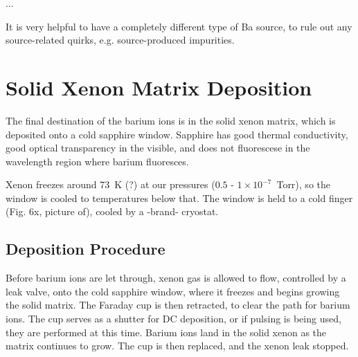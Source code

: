 ...

It is very helpful to have a completely different type of Ba source, to rule out any source-related quirks, e.g. source-produced impurities.

\section{Solid Xenon Matrix Deposition}

The final destination of the barium ions is in the solid xenon matrix, which is deposited onto a cold sapphire window.  Sapphire has good thermal conductivity, good optical transparency in the visible, and does not fluorescese in the wavelength region where barium fluoresces.  

Xenon freezes around 73~K (?) at our pressures ($0.5$ - $1 \times 10^{-7}$~Torr), so the window is cooled to temperatures below that.  The window is held to a cold finger (Fig. 6x, picture of), cooled by a -brand- cryostat. %

\subsection{Deposition Procedure}

Before barium ions are let through, xenon gas is allowed to flow, controlled by a leak valve, onto the cold sapphire window, where it freezes and begins growing the solid matrix.  The Faraday cup is then retracted, to clear the path for barium ions.  The cup serves as a shutter for DC deposition, or if pulsing is being used, they are performed at this time.  Barium ions land in the solid xenon as the matrix continues to grow.  The cup is then replaced, and the xenon leak stopped.